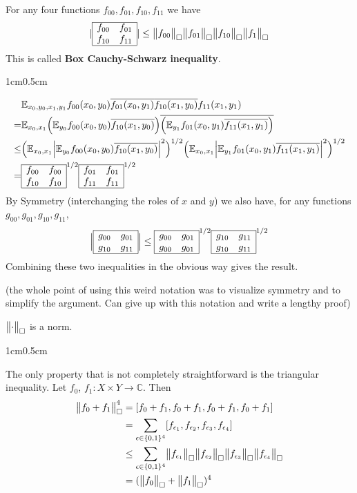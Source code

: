 \documentclass[12pt,a4paper]{report}
\newenvironment{proof}
{\begin{changemargin}{1cm}{0.5cm}
	}%
	{\end{changemargin}
}
\begin{document}
 For any four functions $f_{00}, f_{01}, f_{10}, f_{11}$ we have
\begin{align*}
|\boxinn{f_{00}}{f_{01}}{f_{10}}{f_{11}}| \leq \boxnorm{f_{00}} \boxnorm{f_{01}}\boxnorm{f_{10}}\boxnorm{f_{1}}
\end{align*}
This is called \textbf{Box Cauchy-Schwarz inequality}.
\begin{proof}
\pf \begin{align*}
& \avg_{x_0,y_0,x_1,y_1} f_{00}(x_0,y_0) \bar{f_{01}(x_0,y_1)} \bar{f_{10}(x_1,y_0)} f_{11}(x_1,y_1) \\
=& \avg_{x_0,x_1} \Big( \avg_{y_0} f_{00}(x_0,y_0)   \bar{f_{10}(x_1,y_0)} \Big) \overline{\Big( \avg_{y_1} f_{01}(x_0,y_1) \bar{f_{11}(x_1,y_1)} \Big)} \\
\leq&  \Big( \avg_{x_0,x_1} \Big| \avg_{y_0} f_{00}(x_0,y_0) \bar{f_{10}(x_1,y_0)} \Big|^2 \Big)^{1/2} \Big( \avg_{x_0,x_1} \Big| \avg_{y_1} f_{01}(x_0,y_1) \bar{f_{11}(x_1,y_1)} \Big|^2 \Big)^{1/2} \\
=& \boxinn{f_{00}}{f_{00}}{f_{10}}{f_{10}}^{1/2} \boxinn{f_{01}}{f_{01}}{f_{11}}{f_{11}}^{1/2}
\end{align*}
By Symmetry (interchanging the roles of $x$ and $y$) we also have, for any functions $g_{00}, g_{01}, g_{10}, g_{11}$, 
\begin{align*}
\Big| \boxinn{g_{00}}{g_{01}}{g_{10}}{g_{11}} \Big| \leq \boxinn{g_{00}}{g_{01}}{g_{00}}{g_{01}}^{1/2} \boxinn{g_{10}}{g_{11}}{g_{10}}{g_{11}}^{1/2}
\end{align*}
Combining these two inequalities in the obvious way gives the result.

\eop
\end{proof}
(the whole point of using this weird notation was to visualize symmetry and to simplify the argument. Can give up with this notation and write a lengthy proof)
\s

 $\bigl\lVert\cdot\bigr\rVert_{\tiny{\square}}$ is a norm.
\begin{proof}
\pf The only property that is not completely straightforward is the triangular inequality. Let $f_0$, $f_1: X\times Y \rightarrow \mathbb{C}$. Then
\begin{align*}
\bigl\lVert f_0 + f_1\bigr\rVert_{\tiny{\square}}^4 &=  [f_0+f_1 ,f_0+f_1,f_0+f_1,f_0+f_1] \\
&= \sum_{\epsilon \in \{0,1\}^4} [f_{\epsilon_1},f_{\epsilon_2},f_{\epsilon_3},f_{\epsilon_4}] \\
&\leq \sum_{\epsilon \in \{0,1\}^4} \bigl\lVert f_{\epsilon_1}\bigr\rVert_{\tiny{\square}} \bigl\lVert f_{\epsilon_2}\bigr\rVert_{\tiny{\square}} \bigl\lVert f_{\epsilon_3}\bigr\rVert_{\tiny{\square}} \bigl\lVert f_{\epsilon_4}\bigr\rVert_{\tiny{\square}} \\
&= (\bigl\lVert f_0\bigr\rVert_{\tiny{\square}} + \bigl\lVert f_1\bigr\rVert_{\tiny{\square}})^4
\end{align*}

\eop
\end{proof}
\s
\end{document}
